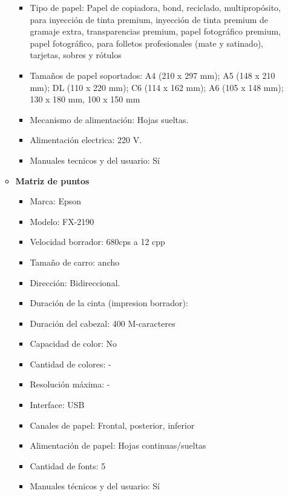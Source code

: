 \begin{enumerate}
\begin{itemize}
\begin{itemize}
      \item Tipo de papel: Papel de copiadora, bond, reciclado, multipropósito, para inyección de tinta premium, inyección de tinta premium de gramaje extra, transparencias premium, papel fotográfico premium, papel fotográfico, para folletos profesionales (mate y satinado), tarjetas, sobres y rótulos
      \item Tamaños de papel soportados: A4 (210 x 297 mm); A5 (148 x 210 mm); DL (110 x 220 mm); C6 (114 x 162 mm); A6 (105 x 148 mm); 130 x 180 mm, 100 x 150 mm
      \item Mecanismo de alimentación: Hojas sueltas.
      
      \item Alimentación electrica: 220 V.
      \item Manuales tecnicos y del usuario: Sí
    \end{itemize}
    
    \item \textbf{Matriz de puntos}
    \begin{itemize}
      \item Marca: Epson
      \item Modelo: FX-2190
      \item Velocidad borrador: 680cps a 12 cpp
      \item Tamaño de carro: ancho
      \item Dirección: Bidireccional.
      \item Duración de la cinta (impresion borrador):
      \item Duración del cabezal: 400 M-caracteres
      
      \item Capacidad de color: No
      \item Cantidad de colores: -
      \item Resolución máxima: -
      
      \item Interface: USB
      
      \item Canales de papel: Frontal, posterior, inferior
      \item Alimentación de papel: Hojas continuas/sueltas
      
      \item Cantidad de fonts: 5
      
      \item Manuales técnicos y del usuario: Sí
    \end{itemize}
    
  \end{itemize}
\end{enumerate} 

